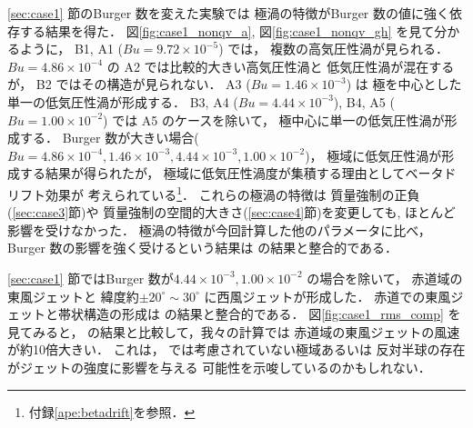 \documentclass[a4j,12pt,openbib,oneside]{jreport}
\begin{document}
\ref{sec:case1} 節のBurger 数を変えた実験では
極渦の特徴がBurger 数の値に強く依存する結果を得た．
%
図\ref{fig:case1_nonqv_a}, 図\ref{fig:case1_nonqv_gh} を見て分かるように，
B1, A1 ($Bu = 9.72\times 10^{-5}$) では，
複数の高気圧性渦が見られる．
%
$Bu = 4.86\times 10^{-4}$ の
A2 では比較的大きい高気圧性渦と
低気圧性渦が混在するが，
B2 ではその構造が見られない．
%
A3 ($Bu = 1.46\times 10^{-3}$) は
極を中心とした単一の低気圧性渦が形成する．
%
B3, A4 ($Bu = 4.44 \times 10^{-3}$), 
B4, A5 ($Bu = 1.00 \times 10^{-2}$) では
A5 のケースを除いて，
極中心に単一の低気圧性渦が形成する．
%
Burger 数が大きい場合($Bu = 4.86 \times 10^{-4}, 1.46 \times 10^{-3}, 4.44 \times 10^{-3}, 1.00 \times 10^{-2}$)，
極域に低気圧性渦が形成する結果が得られたが，
極域に低気圧性渦度が集積する理由としてベータドリフト効果が
考えられている\footnote{付録\ref{ape:betadrift}を参照．}．
%
これらの極渦の特徴は
質量強制の正負(\ref{sec:case3}節)や
質量強制の空間的大きさ(\ref{sec:case4}節)を変更しても, 
ほとんど影響を受けなかった．
% 
極渦の特徴が今回計算した他のパラメータに比べ，
Burger 数の影響を強く受けるという結果は
\cite{Brueshaber2019} の結果と整合的である．
%
%

\ref{sec:case1} 節ではBurger 数が$4.44 \times10^{-3}, 1.00 \times 10^{-2}$ の場合を除いて，
赤道域の東風ジェットと
緯度約$\pm 20^\circ \sim 30^\circ$ に西風ジェットが形成した．
赤道での東風ジェットと帯状構造の形成は
\cite{Showman2007} の結果と整合的である．
%
図\ref{fig:case1_rms_comp} を見てみると，
\cite{Showman2007} の結果と比較して，我々の計算では
赤道域の東風ジェットの風速が約10倍大きい．
これは，\cite{Showman2007} では考慮されていない極域あるいは
反対半球の存在がジェットの強度に影響を与える
可能性を示唆しているのかもしれない．
\end{document}
